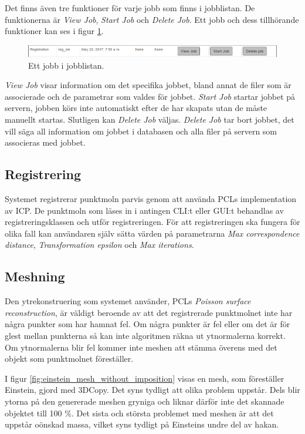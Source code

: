 Det finns även tre funktioner för varje jobb som finns i jobblistan. De funktionerna är \textit{View Job}, \textit{Start Job} och \textit{Delete Job}. Ett jobb och dess tillhörande funktioner kan ses i figur \ref{fig:3DCopyJobInList}.

\begin{figure}[H]
	\centering
	\includegraphics[width=130mm]{figures/3DCopyJobInList.PNG}
	\caption{Ett jobb i jobblistan.}
	\label{fig:3DCopyJobInList}
\end{figure}

\textit{View Job} visar information om det specifika jobbet, bland annat de filer som är associerade och de parametrar som valdes för jobbet. \textit{Start Job} startar jobbet på servern, jobben körs inte automatiskt efter de har skapats utan de måste manuellt startas. Slutligen kan \textit{Delete Job} väljas. \textit{Delete Job} tar bort jobbet, det vill säga all information om jobbet i databasen och alla filer på servern som associeras med jobbet.

\subsection{Registrering}
Systemet registrerar punktmoln parvis genom att använda PCLs implementation av ICP. De punktmoln som läses in i antingen CLI:t eller GUI:t behandlas av registreringsklassen och utför registreringen. För att registreringen ska fungera för olika fall kan användaren själv sätta värden på parametrarna \textit{Max correspondence distance}, \textit{Transformation epsilon} och \textit{Max iterations}.

\subsection{Meshning}
Den ytrekonstruering som systemet använder, PCLs \textit{Poisson surface reconstruction}, är väldigt beroende av att det registrerade punktmolnet inte har några punkter som har hamnat fel. Om några punkter är fel eller om det är för glest mellan punkterna så kan inte algoritmen räkna ut ytnormalerna korrekt. Om ytnormalerna blir fel kommer inte meshen att stämma överens med det objekt som punktmolnet föreställer.

I figur \ref{fig:einstein_mesh_without_imposition} visas en mesh, som föreställer Einstein, gjord med 3DCopy. Det syns tydligt att olika problem uppstår. Dels blir ytorna på den genererade meshen gryniga och liknar därför inte det skannade objektet till 100 \%. Det sista och största problemet med meshen är att det uppstår oönskad massa, vilket syns tydligt på Einsteins undre del av hakan.

